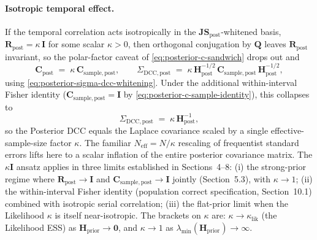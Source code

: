 \documentclass[11pt]{article}
\begin{document}
\paragraph{Isotropic temporal effect.}
If the temporal correlation acts isotropically in the $\mathbf{JS}_{\mathrm{post}}$-whitened basis, $\mathbf R_{\mathrm{post}} = \kappa\,\mathbf I$ for some scalar $\kappa > 0$, then orthogonal conjugation by $\mathbf Q$ leaves $\mathbf R_{\mathrm{post}}$ invariant, so the polar-factor caveat of \eqref{eq:posterior-c-sandwich} drops out and
\begin{equation}
\mathbf C_{\mathrm{post}}
\;=\;
\kappa\,\mathbf C_{\mathrm{sample},\mathrm{post}},
\qquad
\Sigma_{\mathrm{DCC},\mathrm{post}}
\;=\;
\kappa\,
\mathbf H_{\mathrm{post}}^{-1/2}\,
\mathbf C_{\mathrm{sample},\mathrm{post}}\,
\mathbf H_{\mathrm{post}}^{-1/2},
\label{eq:posterior-isotropic-kappa}
\end{equation}
using \eqref{eq:posterior-sigma-dcc-whitening}. Under the additional within-interval Fisher identity ($\mathbf C_{\mathrm{sample},\mathrm{post}} = \mathbf I$ by \eqref{eq:posterior-c-sample-identity}), this collapses to
\begin{equation}
\Sigma_{\mathrm{DCC},\mathrm{post}}
\;=\;
\kappa\,\mathbf H_{\mathrm{post}}^{-1},
\label{eq:posterior-isotropic-laplace}
\end{equation}
so the Posterior DCC equals the Laplace covariance scaled by a single effective-sample-size factor $\kappa$. The familiar $N_{\mathrm{eff}} = N/\kappa$ rescaling of frequentist standard errors lifts here to a scalar inflation of the entire posterior covariance matrix. The $\kappa\mathbf I$ ansatz applies in three limits established in Sections~4--8: (i) the strong-prior regime where $\mathbf R_{\mathrm{post}} \to \mathbf I$ and $\mathbf C_{\mathrm{sample},\mathrm{post}} \to \mathbf I$ jointly (Section~5.3), with $\kappa \to 1$; (ii) the within-interval Fisher identity (population correct specification, Section~10.1) combined with isotropic serial correlation; (iii) the flat-prior limit when the Likelihood $\kappa$ is itself near-isotropic. The brackets on $\kappa$ are: $\kappa \to \kappa_{\mathrm{lik}}$ (the Likelihood ESS) as $\mathbf H_{\mathrm{prior}} \to \mathbf 0$, and $\kappa \to 1$ as $\lambda_{\min}(\mathbf H_{\mathrm{prior}}) \to \infty$.
\end{document}
